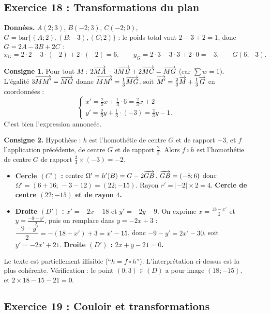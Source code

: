 \subsection{Exercice 18 : Transformations du plan}

\textbf{Donn\'ees.} $A(2;3)$, $B(-2;3)$, $C(-2;0)$, $G=\mathrm{bar}\{(A;2),(B;-3),(C;2)\}$ :
le poids total vaut $2-3+2=1$, donc $G=2A-3B+2C$ :
\[
x_G=2\cdot2-3\cdot(-2)+2\cdot(-2)=6,\qquad y_G=2\cdot3-3\cdot3+2\cdot0=-3.\qquad G(6;-3).
\]

\textbf{Consigne 1.} Pour tout $M$ : $2\overrightarrow{MA}-3\overrightarrow{MB}+2\overrightarrow{MC}=\overrightarrow{MG}$ (car $\sum w=1$).
L'\'egalit\'e $3\overrightarrow{MM'}=\overrightarrow{MG}$ donne $\overrightarrow{MM'}=\frac13\overrightarrow{MG}$, soit
$\overrightarrow{M'}=\frac23\overrightarrow{M}+\frac13\overrightarrow{G}$ en coordonn\'ees :
\[
\begin{cases}
x'=\frac23x+\frac13\cdot6=\frac23x+2\\[2pt]
y'=\frac23y+\frac13\cdot(-3)=\frac23y-1.
\end{cases}
\]
C'est bien l'expression annonc\'ee.

\textbf{Consigne 2.} Hypoth\`ese : $h$ est l'homoth\'etie de centre $G$ et de rapport $-3$, et $f$ l'application pr\'ec\'edente,
de centre $G$ et de rapport $\frac23$. Alors $f\circ h$ est l'homoth\'etie de centre $G$ de rapport $\frac23\times(-3)=-2$.
\begin{itemize}
  \item \textbf{Cercle $(C')$ :} centre $\Omega'=h'(B)=G-2\overrightarrow{GB}$. $\overrightarrow{GB}=(-8;6)$ donc $\Omega'=(6+16;\,-3-12)=(22;-15)$.
  Rayon $r'=|-2|\times2=4$. \textbf{Cercle de centre $(22;-15)$ et de rayon $4$.}
  \item \textbf{Droite $(D')$ :} $x'=-2x+18$ et $y'=-2y-9$. On exprime $x=\frac{18-x'}{2}$ et $y=\frac{-9-y'}{2}$,
  puis on remplace dans $y=-2x+3$ :
  $\dfrac{-9-y'}{2}=-(18-x')+3=x'-15$, donc $-9-y'=2x'-30$, soit $y'=-2x'+21$.
  \textbf{Droite $(D')$ : $2x+y-21=0$.}
\end{itemize}
\begin{rem} Le texte est partiellement illisible (``$h=f\circ h$''). L'interpr\'etation ci-dessus est la plus coh\'erente.
V\'erification : le point $(0;3)\in(D)$ a pour image $(18;-15)$, et $2\times18-15-21=0$.\end{rem}

\subsection{Exercice 19 : Couloir et transformations}


